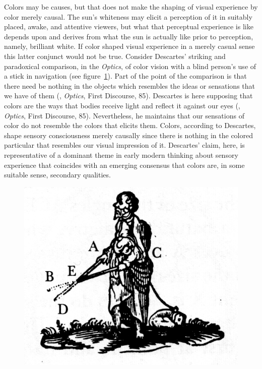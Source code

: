 Colors may be causes, but that does not make the shaping of visual experience by color merely causal. The sun's whiteness may elicit a perception of it in suitably placed, awake, and attentive viewers, but what that perceptual experience is like depends upon and derives from what the sun is actually like prior to perception, namely, brilliant white. If color shaped visual experience in a merely casual sense this latter conjunct would not be true. Consider Descartes' \citeyearpar{Descartes:1637uq} striking and paradoxical comparison, in the \emph{Optics}, of color vision with a blind person's use of a stick in navigation (see figure~\ref{fig:blind}). Part of the point of the comparison is that there need be nothing in the objects which resembles the ideas or sensations that we have of them (\citealt{Descartes:1637uq}, \emph{Optics}, First Discourse, 85). Descartes is here supposing that colors are the ways that bodies receive light and reflect it against our eyes (\citealt{Descartes:1637uq}, \emph{Optics}, First Discourse, 85). Nevertheless, he maintains that our sensations of color do not resemble the colors that elicits them. Colors, according to Descartes, shape sensory consciousness merely causally since there is nothing in the colored particular that resembles our visual impression of it. Descartes' claim, here, is representative of a dominant theme in early modern thinking about sensory experience that coincides with an emerging consensus that colors are, in some suitable sense, secondary qualities.

\begin{figure}[htbp]
	\centering
		\includegraphics[scale=2]{graphics/blind.jpeg}
	\caption{\citealt{Descartes:1637uq}}
	\label{fig:blind}
\end{figure}

